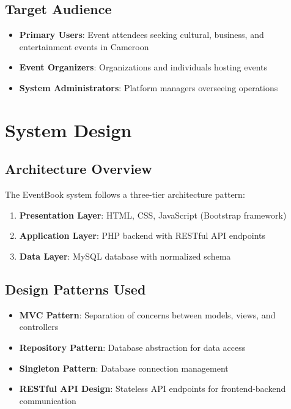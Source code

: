 \documentclass[12pt,a4paper]{article}
\begin{document}
\subsection{Target Audience}
\begin{itemize}
    \item \textbf{Primary Users}: Event attendees seeking cultural, business, and entertainment events in Cameroon
    \item \textbf{Event Organizers}: Organizations and individuals hosting events
    \item \textbf{System Administrators}: Platform managers overseeing operations
\end{itemize}

\section{System Design}

\subsection{Architecture Overview}
The EventBook system follows a three-tier architecture pattern:

\begin{enumerate}
    \item \textbf{Presentation Layer}: HTML, CSS, JavaScript (Bootstrap framework)
    \item \textbf{Application Layer}: PHP backend with RESTful API endpoints
    \item \textbf{Data Layer}: MySQL database with normalized schema
\end{enumerate}

\subsection{Design Patterns Used}
\begin{itemize}
    \item \textbf{MVC Pattern}: Separation of concerns between models, views, and controllers
    \item \textbf{Repository Pattern}: Database abstraction for data access
    \item \textbf{Singleton Pattern}: Database connection management
    \item \textbf{RESTful API Design}: Stateless API endpoints for frontend-backend communication
\end{itemize}
\end{document}
